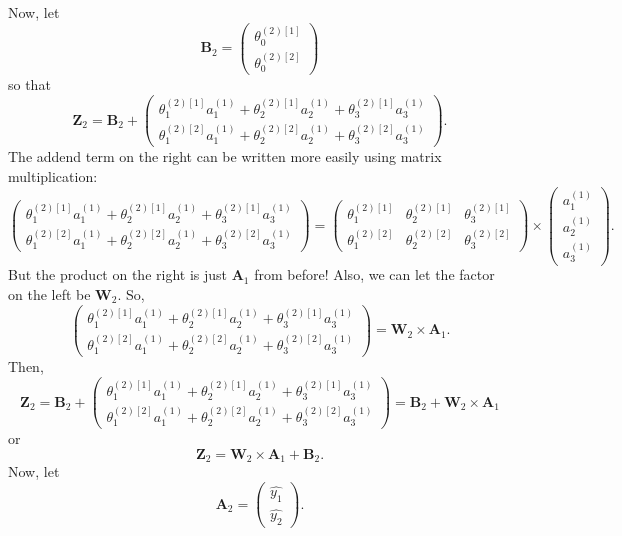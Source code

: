 \documentclass{article}
\begin{document}
Now, let 
\[\textbf{B}_2=\begin{pmatrix}
\theta_0^{(2)[1]}\\
\theta_0^{(2)[2]}
\end{pmatrix}\]
so that 
\[\textbf{Z}_2=\textbf{B}_2+\begin{pmatrix}
\theta_1^{(2)[1]}a^{(1)}_1+\theta_2^{(2)[1]}a^{(1)}_2+\theta_3^{(2)[1]}a^{(1)}_3\\
\theta_1^{(2)[2]}a^{(1)}_1+\theta_2^{(2)[2]}a^{(1)}_2+\theta_3^{(2)[2]}a^{(1)}_3
\end{pmatrix}.\]
The addend term on the right can be written more easily using matrix multiplication:
\[\begin{pmatrix}
\theta_1^{(2)[1]}a^{(1)}_1+\theta_2^{(2)[1]}a^{(1)}_2+\theta_3^{(2)[1]}a^{(1)}_3\\
\theta_1^{(2)[2]}a^{(1)}_1+\theta_2^{(2)[2]}a^{(1)}_2+\theta_3^{(2)[2]}a^{(1)}_3
\end{pmatrix}=\begin{pmatrix}
\theta_1^{(2)[1]} & \theta_2^{(2)[1]} & \theta_3^{(2)[1]}\\
\theta_1^{(2)[2]} & \theta_2^{(2)[2]} & \theta_3^{(2)[2]}
\end{pmatrix}\times \begin{pmatrix}
a^{(1)}_1\\
a^{(1)}_2\\
a^{(1)}_3
\end{pmatrix}.\]
But the product on the right is just $\textbf{A}_1$ from before! Also, we can let the factor on the left be $\textbf{W}_2$. So, 
\[\begin{pmatrix}
\theta_1^{(2)[1]}a^{(1)}_1+\theta_2^{(2)[1]}a^{(1)}_2+\theta_3^{(2)[1]}a^{(1)}_3\\
\theta_1^{(2)[2]}a^{(1)}_1+\theta_2^{(2)[2]}a^{(1)}_2+\theta_3^{(2)[2]}a^{(1)}_3
\end{pmatrix}=\textbf{W}_2\times \textbf{A}_1.\]
Then, 
\[\textbf{Z}_2=\textbf{B}_2+\begin{pmatrix}
\theta_1^{(2)[1]}a^{(1)}_1+\theta_2^{(2)[1]}a^{(1)}_2+\theta_3^{(2)[1]}a^{(1)}_3\\
\theta_1^{(2)[2]}a^{(1)}_1+\theta_2^{(2)[2]}a^{(1)}_2+\theta_3^{(2)[2]}a^{(1)}_3
\end{pmatrix}=\textbf{B}_2+\textbf{W}_2\times \textbf{A}_1\]
or 
\[\textbf{Z}_2=\textbf{W}_2\times \textbf{A}_1+\textbf{B}_2.\]
Now, let 
\[\textbf{A}_2=\begin{pmatrix}
\hat{y_1}\\
\hat{y_2}
\end{pmatrix}.\]
\end{document}
